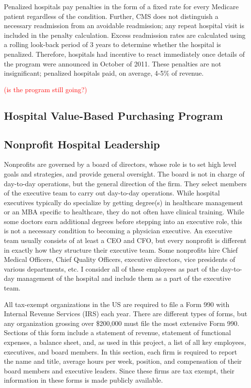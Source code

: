 \documentclass[12pt]{article}
\begin{document}
    Penalized hospitals pay penalties in the form of a fixed rate for every Medicare patient regardless of the condition. Further, CMS does not distinguish a necessary readmission from an avoidable readmission; any repeat hospital visit is included in the penalty calculation. Excess readmission rates are calculated using a rolling look-back period of 3 years to determine whether the hospital is penalized. Therefore, hospitals had incentive to react immediately once details of the program were announced in October of 2011. These penalties are not insignificant; penalized hospitals paid, on average, 4-5\% of revenue. 

    \textcolor{red}{(is the program still going?)}

    \subsection{Hospital Value-Based Purchasing Program}

    \subsection{Nonprofit Hospital Leadership}

    Nonprofits are governed by a board of directors, whose role is to set high level goals and strategies, and provide general oversight. The board is not in charge of day-to-day operations, but the general direction of the firm. They select members of the executive team to carry out day-to-day operations. While hospital executives typically do specialize by getting degree(s) in healthcare management or an MBA specific to healthcare, they do not often have clinical training. While some doctors earn additional degrees before stepping into an executive role, this is not a necessary condition to becoming a physician executive. An executive team usually consists of at least a CEO and CFO, but every nonprofit is different in exactly how they structure their executive team. Some nonprofits hire Chief Medical Officers, Chief Quality Officers, executive directors, vice presidents of various departments, etc. I consider all of these employees as part of the day-to-day management of the hospital and include them as a part of the executive team. 

    All tax-exempt organizations in the US are required to file a Form 990 with Internal Revenue Services (IRS) each year. There are different types of forms, but any organization grossing over \$200,000 must file the most extensive Form 990. Sections of this form include a statement of revenue, statement of functional expenses, a balance sheet, and, as used in this project, a list of all key employees, executives, and board members. In this section, each firm is required to report the name and title, average hours per week, position, and compensation of their board members and executive leaders. Since these firms are tax exempt, their information in these forms is made publicly available.  
\end{document}
